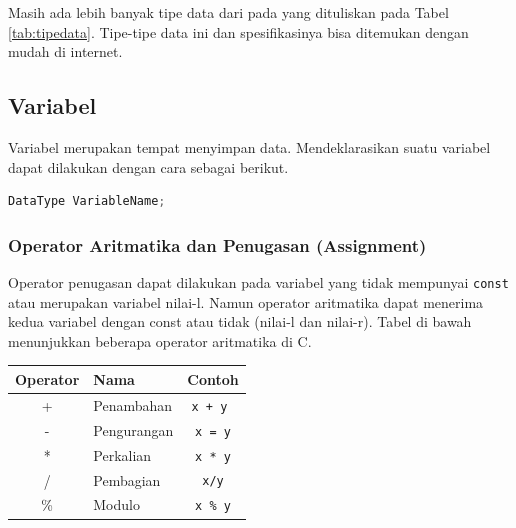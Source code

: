 Masih ada lebih banyak tipe data dari pada yang dituliskan pada Tabel \ref{tab:tipedata}. Tipe-tipe data ini dan spesifikasinya bisa ditemukan dengan mudah di internet.

\subsection{Variabel}
Variabel merupakan tempat menyimpan data. Mendeklarasikan suatu variabel dapat dilakukan dengan cara sebagai berikut.
\begin{lstlisting}[language=c,caption=Deklarasi Variabel C,label=lst:deklarasivariabel,captionpos=t]
DataType VariableName;
\end{lstlisting}
\subsubsection{Operator Aritmatika dan Penugasan (Assignment)}
Operator penugasan dapat dilakukan pada variabel yang tidak mempunyai \verb*|const| atau merupakan variabel nilai-l. Namun operator aritmatika dapat menerima kedua variabel dengan const atau tidak (nilai-l dan nilai-r).
Tabel di bawah menunjukkan beberapa operator aritmatika di C.
\begin{center}
	\begin{tabular}{|c|l|c|}
		\hline
		\multicolumn{1}{|l|}{\textbf{Operator}} & \textbf{Nama} & \multicolumn{1}{l|}{\textbf{Contoh}} \\ \hline
		+  & Penambahan &\verb|x + y |  \\ \hline
		-  & Pengurangan &\verb|x = y|   \\ \hline
		*  & Perkalian   & \verb|x * y|  \\ \hline
		/  & Pembagian   & \verb|x/y|  \\ \hline
		\% & Modulo     & \verb|x % y| \\ \hline
	\end{tabular}
\end{center}

